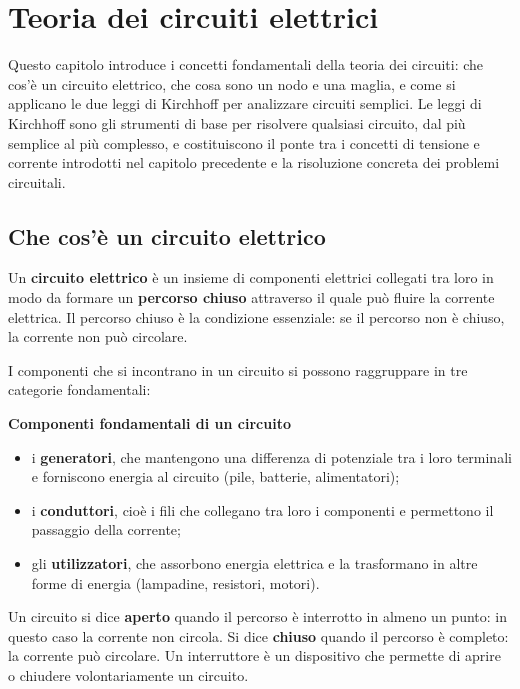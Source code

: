 \chapter{Teoria dei circuiti elettrici}

\begin{concetto}
Questo capitolo introduce i concetti fondamentali della teoria dei circuiti: che cos'è un circuito elettrico, che cosa sono un nodo e una maglia, e come si applicano le due leggi di Kirchhoff per analizzare circuiti semplici. Le leggi di Kirchhoff sono gli strumenti di base per risolvere qualsiasi circuito, dal più semplice al più complesso, e costituiscono il ponte tra i concetti di tensione e corrente introdotti nel capitolo precedente e la risoluzione concreta dei problemi circuitali.
\end{concetto}

\section{Che cos'è un circuito elettrico}

Un \textbf{circuito elettrico} è un insieme di componenti elettrici collegati tra loro in modo da formare un \textbf{percorso chiuso} attraverso il quale può fluire la corrente elettrica. Il percorso chiuso è la condizione essenziale: se il percorso non è chiuso, la corrente non può circolare.

I componenti che si incontrano in un circuito si possono raggruppare in tre categorie fondamentali:

\begin{concetto}
\textbf{Componenti fondamentali di un circuito}
\begin{itemize}[leftmargin=1cm]
  \item i \textbf{generatori}, che mantengono una differenza di potenziale tra i loro terminali e forniscono energia al circuito (pile, batterie, alimentatori);
  \item i \textbf{conduttori}, cioè i fili che collegano tra loro i componenti e permettono il passaggio della corrente;
  \item gli \textbf{utilizzatori}, che assorbono energia elettrica e la trasformano in altre forme di energia (lampadine, resistori, motori).
\end{itemize}
\end{concetto}

Un circuito si dice \textbf{aperto} quando il percorso è interrotto in almeno un punto: in questo caso la corrente non circola. Si dice \textbf{chiuso} quando il percorso è completo: la corrente può circolare. Un interruttore è un dispositivo che permette di aprire o chiudere volontariamente un circuito.

